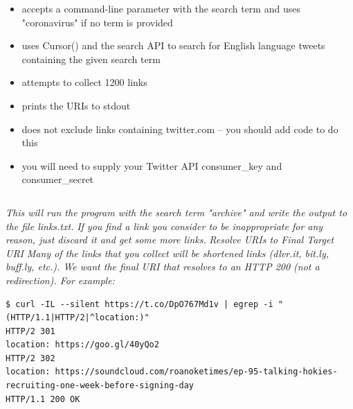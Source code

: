 \documentclass[12pt]{article}
\begin{document}
\begin{itemize}
    \item accepts a command-line parameter with the search term and uses "coronavirus" if no term is provided
    \item uses Cursor() and the search API to search for English language tweets containing the given search term
    \item attempts to collect 1200 links
    \item prints the URIs to stdout
    \item does not exclude links containing twitter.com -- you should add code to do this
    \item you will need to supply your Twitter API consumer\_key and consumer\_secret

\end{itemize}
\begin{lstlisting}[numbers=none]
    % python3 collect-links-cursor.py archive > links.txt
\end{lstlisting}
\emph{This will run the program with the search term "archive" and write the output to the file links.txt.}
\newline
\emph{If you find a link you consider to be inappropriate for any reason, just discard it and get some more links.}
\newline
\newline
\emph{Resolve URIs to Final Target URI}
\newline
\newline
\emph{Many of the links that you collect will be shortened links (dlvr.it, bit.ly, buff.ly, etc.). We want the final URI that resolves to an HTTP 200 (not a redirection). For example:}
\newline
\begin{lstlisting}[numbers=none]
$ curl -IL --silent https://t.co/DpO767Md1v | egrep -i "(HTTP/1.1|HTTP/2|^location:)"
HTTP/2 301
location: https://goo.gl/40yQo2
HTTP/2 302
location: https://soundcloud.com/roanoketimes/ep-95-talking-hokies-recruiting-one-week-before-signing-day
HTTP/1.1 200 OK
\end{lstlisting}
\end{document}
